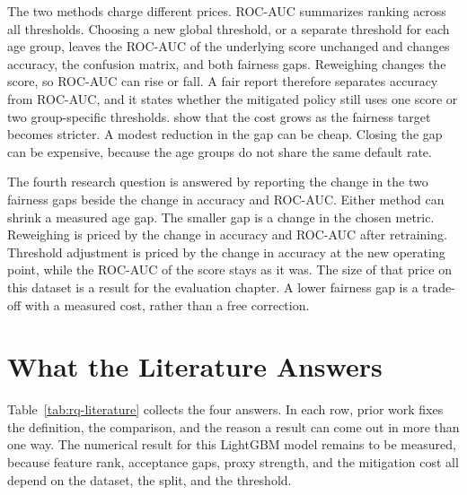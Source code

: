 The two methods charge different prices. ROC-AUC summarizes ranking across all thresholds. Choosing a new global threshold, or a separate threshold for each age group, leaves the ROC-AUC of the underlying score unchanged and changes accuracy, the confusion matrix, and both fairness gaps. Reweighing changes the score, so ROC-AUC can rise or fall. A fair report therefore separates accuracy from ROC-AUC, and it states whether the mitigated policy still uses one score or two group-specific thresholds. \citet{kozodoi2022fairness} show that the cost grows as the fairness target becomes stricter. A modest reduction in the gap can be cheap. Closing the gap can be expensive, because the age groups do not share the same default rate.

The fourth research question is answered by reporting the change in the two fairness gaps beside the change in accuracy and ROC-AUC. Either method can shrink a measured age gap. The smaller gap is a change in the chosen metric. Reweighing is priced by the change in accuracy and ROC-AUC after retraining. Threshold adjustment is priced by the change in accuracy at the new operating point, while the ROC-AUC of the score stays as it was. The size of that price on this dataset is a result for the evaluation chapter. A lower fairness gap is a trade-off with a measured cost, rather than a free correction.

\section{What the Literature Answers}
\label{sec:related-rq}

Table~\ref{tab:rq-literature} collects the four answers. In each row, prior work fixes the definition, the comparison, and the reason a result can come out in more than one way. The numerical result for this LightGBM model remains to be measured, because feature rank, acceptance gaps, proxy strength, and the mitigation cost all depend on the dataset, the split, and the threshold.

